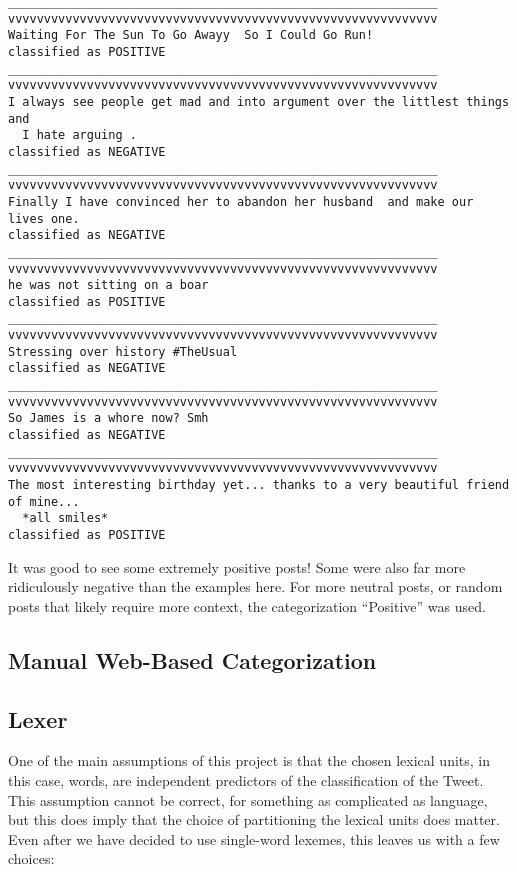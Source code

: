 \documentclass[12pt,a4paper]{article}
\begin{document}
\begin{verbatim}
____________________________________________________________
vvvvvvvvvvvvvvvvvvvvvvvvvvvvvvvvvvvvvvvvvvvvvvvvvvvvvvvvvvvv
Waiting For The Sun To Go Awayy  So I Could Go Run!
classified as POSITIVE
____________________________________________________________
vvvvvvvvvvvvvvvvvvvvvvvvvvvvvvvvvvvvvvvvvvvvvvvvvvvvvvvvvvvv
I always see people get mad and into argument over the littlest things  and
  I hate arguing .
classified as NEGATIVE
____________________________________________________________
vvvvvvvvvvvvvvvvvvvvvvvvvvvvvvvvvvvvvvvvvvvvvvvvvvvvvvvvvvvv
Finally I have convinced her to abandon her husband  and make our lives one.
classified as NEGATIVE
____________________________________________________________
vvvvvvvvvvvvvvvvvvvvvvvvvvvvvvvvvvvvvvvvvvvvvvvvvvvvvvvvvvvv
he was not sitting on a boar
classified as POSITIVE
____________________________________________________________
vvvvvvvvvvvvvvvvvvvvvvvvvvvvvvvvvvvvvvvvvvvvvvvvvvvvvvvvvvvv
Stressing over history #TheUsual
classified as NEGATIVE
____________________________________________________________
vvvvvvvvvvvvvvvvvvvvvvvvvvvvvvvvvvvvvvvvvvvvvvvvvvvvvvvvvvvv
So James is a whore now? Smh
classified as NEGATIVE
____________________________________________________________
vvvvvvvvvvvvvvvvvvvvvvvvvvvvvvvvvvvvvvvvvvvvvvvvvvvvvvvvvvvv
The most interesting birthday yet... thanks to a very beautiful friend of mine...
  *all smiles*
classified as POSITIVE
\end{verbatim}

It was good to see some extremely positive posts!  Some were also far more ridiculously negative than the examples here.  For more neutral posts, or random posts that likely require more context, the categorization ``Positive'' was used.

\subsection { Manual Web-Based Categorization }



\subsection { Lexer }

One of the main assumptions of this project is that the chosen lexical units, in this case, words, are independent predictors of the classification of the Tweet.  This assumption cannot be correct, for something as complicated as language, but this does imply that the choice of partitioning the lexical units does matter.  Even after we have decided to use single-word lexemes, this leaves us with a few choices:
\end{document}
